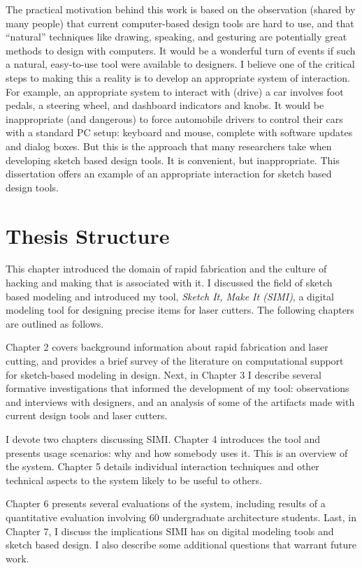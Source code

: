 The practical motivation behind this work is based on the observation
(shared by many people) that current computer-based design tools are
hard to use, and that ``natural'' techniques like drawing, speaking,
and gesturing are potentially great methods to design with
computers. It would be a wonderful turn of events if such a natural,
easy-to-use tool were available to designers. I believe one of the
critical steps to making this a reality is to develop an appropriate
system of interaction. For example, an appropriate system to interact
with (drive) a car involves foot pedals, a steering wheel, and
dashboard indicators and knobs. It would be inappropriate (and
dangerous) to force automobile drivers to control their cars with a
standard PC setup: keyboard and mouse, complete with software updates
and dialog boxes. But this is the approach that many researchers take
when developing sketch based design tools. It is convenient, but
inappropriate. This dissertation offers an example of an appropriate
interaction for sketch based design tools.

\section{Thesis Structure}

This chapter introduced the domain of rapid fabrication and the
culture of hacking and making that is associated with it.  I discussed
the field of sketch based modeling and introduced my tool,
\textit{Sketch It, Make It (SIMI)}, a digital modeling tool for
designing precise items for laser cutters. The following chapters are
outlined as follows.

Chapter 2 covers background information about rapid fabrication and
laser cutting, and provides a brief survey of the literature on
computational support for sketch-based modeling in design. Next, in
Chapter 3 I describe several formative investigations that informed
the development of my tool: observations and interviews with
designers, and an analysis of some of the artifacts made with current
design tools and laser cutters.

I devote two chapters discussing SIMI. Chapter 4 introduces the tool
and presents usage scenarios: why and how somebody uses it. This is an
overview of the system. Chapter 5 details individual interaction
techniques and other technical aspects to the system likely to be
useful to others.

Chapter 6 presents several evaluations of the system, including
results of a quantitative evaluation involving 60 undergraduate
architecture students. Last, in Chapter 7, I discuss the implications
SIMI has on digital modeling tools and sketch based design. I also
describe some additional questions that warrant future work.
